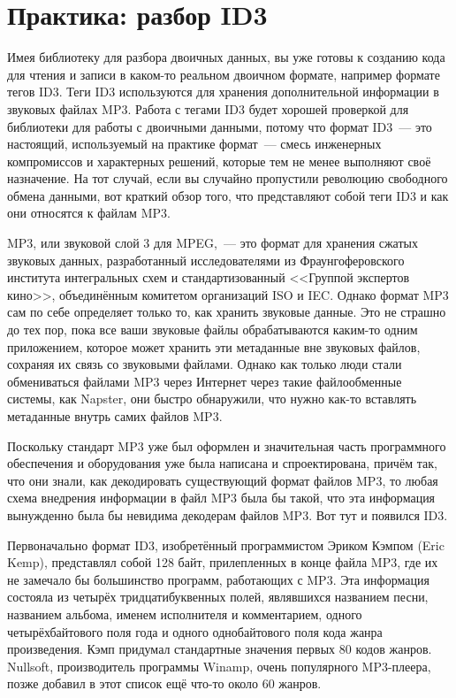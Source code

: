 \chapter{Практика: разбор ID3}
\label{ch:25}

\thispagestyle{empty}

Имея библиотеку для разбора двоичных данных, вы уже готовы к созданию кода для чтения и
записи в каком-то реальном двоичном формате, например формате тегов ID3. Теги ID3
используются для хранения дополнительной информации в звуковых файлах MP3. Работа с тегами
ID3 будет хорошей проверкой для библиотеки для работы с двоичными данными, потому что
формат ID3~--- это настоящий, используемый на практике формат~--- смесь инженерных
компромиссов и характерных решений, которые тем не менее выполняют своё назначение. На
тот случай, если вы случайно пропустили революцию свободного обмена данными, вот краткий
обзор того, что представляют собой теги ID3 и как они относятся к файлам MP3.

MP3, или звуковой слой 3 для MPEG,~--- это формат для хранения
сжатых звуковых данных, разработанный исследователями из Фраунгоферовского института
ин\-тег\-раль\-ных схем и стандартизованный <<Группой экспертов кино>>, объединённым комитетом организаций ISO и IEC. Однако формат MP3 сам по себе определяет только то, как хранить звуковые
данные. Это не страшно до тех пор, пока все ваши звуковые файлы обрабатываются каким-то
одним приложением, которое может хранить эти метаданные вне звуковых файлов, сохраняя их
связь со звуковыми файлами. Однако как только люди стали обмениваться файлами MP3 через
Интернет через такие файлообменные системы, как Napster, они быстро обнаружили, что нужно
как-то вставлять метаданные внутрь самих файлов MP3.

Поскольку стандарт MP3 уже был оформлен и значительная часть программного обеспечения и
оборудования уже была написана и спроектирована, причём так, что они знали, как
декодировать существующий формат файлов MP3, то любая схема внедрения информации в файл
MP3 была бы такой, что эта информация вынужденно была бы невидима декодерам файлов MP3. Вот
тут и появился ID3.

Первоначально формат ID3, изобретённый программистом Эриком Кэмпом (Eric Kemp),
представлял собой 128 байт, прилепленных в конце файла MP3, где их не замечало бы
большинство программ, работающих с MP3. Эта информация состояла из четырёх
тридцатибуквенных полей, являвшихся названием песни, названием альбома, именем исполнителя
и комментарием, одного четырёхбайтового поля года и одного однобайтового поля кода жанра
произведения. Кэмп придумал стандартные значения первых 80 кодов жанров. Nullsoft,
производитель программы Winamp, очень популярного MP3-плеера, позже добавил в этот список
ещё что-то около 60 жанров.

